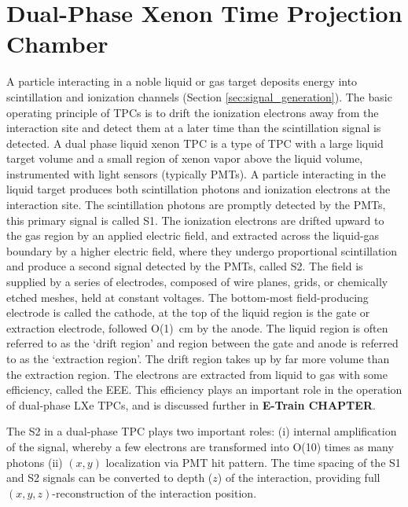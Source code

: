 \section{Dual-Phase Xenon Time Projection Chamber}
A particle interacting in a noble liquid or gas target deposits energy into scintillation and ionization channels (Section \ref{sec:signal_generation}). The basic operating principle of \ac{TPC}s is to drift the ionization electrons away from the interaction site and detect them at a later time than the scintillation signal is detected. A dual phase liquid xenon \ac{TPC} is a type of \ac{TPC} with a large liquid target volume and a small region of xenon vapor above the liquid volume, instrumented with light sensors (typically \ac{PMT}s). A particle interacting in the liquid target produces both scintillation photons and ionization electrons at the interaction site. The scintillation photons are promptly detected by the \ac{PMT}s, this primary signal is called S1. The ionization electrons are drifted upward to the gas region by an applied electric field, and extracted across the liquid-gas boundary by a higher electric field, where they undergo proportional scintillation and produce a second signal detected by the \ac{PMT}s, called S2. The field is supplied by a series of electrodes, composed of wire planes, grids, or chemically etched meshes, held at constant voltages. The bottom-most field-producing electrode is called the cathode, at the top of the liquid region is the gate or extraction electrode, followed O(1)~cm by the anode. The liquid region is often referred to as the `drift region' and region between the gate and anode is referred to as the `extraction region'. The drift region takes up by far more volume than the extraction region. The electrons are extracted from liquid to gas with some efficiency, called the \ac{EEE}. This efficiency plays an important role in the operation of dual-phase \ac{LXe} \ac{TPC}s, and is discussed further in  \textbf{E-Train CHAPTER}.

The S2 in a dual-phase \ac{TPC} plays two important roles: (i) internal amplification of the signal, whereby a few electrons are transformed into O(10) times as many photons (ii) $(x,y)$ localization via \ac{PMT} hit pattern. The time spacing of the S1 and S2 signals can be converted to depth ($z$) of the interaction, providing full $(x,y,z)$-reconstruction of the interaction position.


